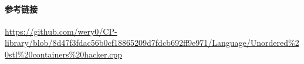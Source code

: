 \paragraph{参考链接}

\url{https://github.com/wery0/CP-library/blob/8d47f3fdac56b0cf18865209d7fdcb692ff9e971/Language/Unordered%20stl%20containers%20hacker.cpp}
